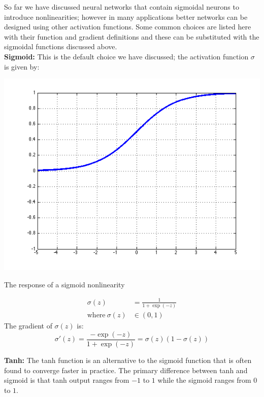 \documentclass{tufte-handout}
\begin{document}
So far we have discussed neural networks that contain sigmoidal neurons to introduce nonlinearities; however in many applications better networks can be designed using other activation functions. Some common choices are listed here with their function and gradient definitions and these can be substituted with the sigmoidal functions discussed above.
$$ $$
\textbf{Sigmoid:} This is the default choice we have discussed; the activation function $\sigma$ is given by:
\begin{marginfigure}%
  \includegraphics[width=\linewidth]{graph_sigmoid}
  \caption{The response of a sigmoid nonlinearity}
  \label{fig:graph_sigmoid}
\end{marginfigure}
\begin{align*}
  \sigma(z) &= \frac{1}{1 + \operatorname{exp}(-z)}\\
  \text{where}~\sigma(z) &\in (0, 1)
\end{align*}
The gradient of $ \sigma(z) $ is:
$$ \sigma'(z) = \frac{- \operatorname{exp}(-z)}{1 +  \operatorname{exp}(-z)} = \sigma(z) (1 - \sigma(z))$$

\textbf{Tanh:} The tanh function is an alternative to the sigmoid function that is often found to converge faster in practice. The primary difference between tanh and sigmoid is that tanh output ranges from $-1$ to $1$ while the sigmoid ranges from $0$ to $1$.
\end{document}
